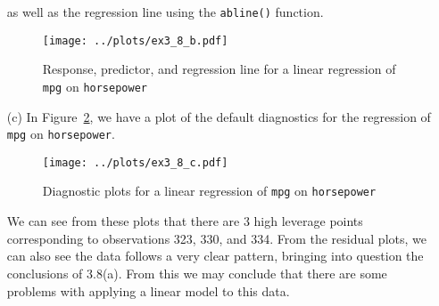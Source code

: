 \begin{itemize}
        as well as the regression line using the \verb|abline()| function.
        \begin{figure}[!ht]
            \texttt{[image: ../plots/ex3\_8\_b.pdf]}
            \caption{Response, predictor, and regression line for a linear regression
            of \\ \texttt{mpg} on \texttt{horsepower}\label{fig9}}
        \end{figure}
    \item[(c)] In Figure~\ref{fig10}, we have a plot of the default diagnostics
        for the regression of \verb|mpg| on \verb|horsepower|.
        \begin{figure}[!ht]
            \texttt{[image: ../plots/ex3\_8\_c.pdf]}
            \caption{Diagnostic plots for a linear regression of \texttt{mpg} on 
            \texttt{horsepower}\label{fig10}}
        \end{figure}
        We can see from these plots that there are 3 high leverage points corresponding
        to observations 323, 330, and 334. From the residual plots, we can also see 
        the data follows a very clear pattern, bringing into question the conclusions
        of 3.8(a). From this we may conclude that there are some problems with applying
        a linear model to this data.
        
\end{itemize}
